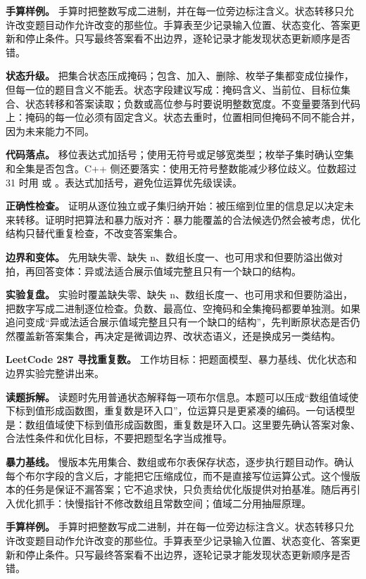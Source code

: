 \textbf{手算样例。} 手算时把整数写成二进制，并在每一位旁边标注含义。状态转移只允许改变题目动作允许改变的那些位。手算表至少记录输入位置、状态变化、答案更新和停止条件。只写最终答案看不出边界，逐轮记录才能发现状态更新顺序是否错。

\textbf{状态升级。} 把集合状态压成掩码；包含、加入、删除、枚举子集都变成位操作，但每一位的题目含义不能丢。状态字段建议写成：掩码含义、当前位、目标位集合、状态转移和答案读取；负数或高位参与时要说明整数宽度。不变量要落到代码上：掩码的每一位必须有固定含义。状态去重时，位置相同但掩码不同不能合并，因为未来能力不同。

\textbf{代码落点。} 移位表达式加括号；使用无符号或足够宽类型；枚举子集时确认空集和全集是否包含。C++ 侧还要落实：使用无符号整数能减少移位歧义。位数超过 31 时用  或 。表达式加括号，避免位运算优先级误读。

\textbf{正确性检查。} 证明从逐位独立或子集归纳开始：被压缩到位里的信息足以决定未来转移。证明时把算法和暴力版对齐：暴力能覆盖的合法候选仍然会被考虑，优化结构只替代重复检查，不改变答案集合。

\textbf{边界和变体。} 先用缺失零、缺失 n、数组长度一、也可用求和但要防溢出做对拍，再回答变体：异或法适合展示值域完整且只有一个缺口的结构。

\textbf{实验复盘。} 实验时覆盖缺失零、缺失 n、数组长度一、也可用求和但要防溢出，把数字写成二进制逐位检查。负数、最高位、空掩码和全集掩码都要单独测。如果追问变成“异或法适合展示值域完整且只有一个缺口的结构”，先判断原状态是否仍然覆盖新答案集合，再决定是微调边界、改状态语义，还是换成另一类结构。

\noindent\textbf{LeetCode 287 寻找重复数。} 工作坊目标：把题面模型、暴力基线、优化状态和边界实验完整讲出来。

\textbf{读题拆解。} 读题时先用普通状态解释每一项布尔信息。本题可以压成“数组值域使下标到值形成函数图，重复数是环入口”，位运算只是更紧凑的编码。一句话模型是：数组值域使下标到值形成函数图，重复数是环入口。这里要先确认答案对象、合法性条件和优化目标，不要把题型名字当成推导。

\textbf{暴力基线。} 慢版本先用集合、数组或布尔表保存状态，逐步执行题目动作。确认每个布尔字段的含义后，才能把它压缩成位，而不是直接写位运算公式。这个慢版本的任务是保证不漏答案；它不追求快，只负责给优化版提供对拍基准。随后再引入优化抓手：快慢指针不修改数组且常数空间；值域二分用抽屉原理。

\textbf{手算样例。} 手算时把整数写成二进制，并在每一位旁边标注含义。状态转移只允许改变题目动作允许改变的那些位。手算表至少记录输入位置、状态变化、答案更新和停止条件。只写最终答案看不出边界，逐轮记录才能发现状态更新顺序是否错。

